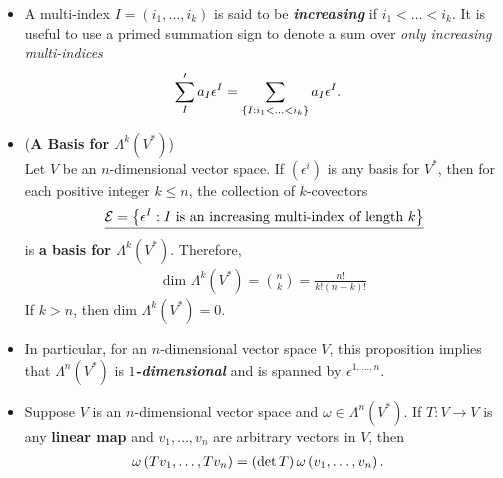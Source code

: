 \documentclass[11pt]{article}
\begin{document}
\begin{itemize}
\item \begin{definition}
A multi-index $I=(i_1,\ldots, i_k)$ is said to be \emph{\textbf{increasing}} if $i_1 < \ldots < i_k$. It is useful
to use a primed summation sign to denote a sum over \emph{only increasing multi-indices}
\begin{align*}
\sum_{I}'a_{I}\epsilon^{I} &= \sum_{\left\{I: i_1 < \ldots < i_k\right\}}a_{I}\epsilon^{I}.
\end{align*}
\end{definition}

\item \begin{proposition}\label{prop: basis_alternating_tensor} (\textbf{A Basis for $\Lambda^k(V^{*})$})\\
Let $V$ be an $n$-dimensional vector space. If $(\epsilon^i)$ is any basis for $V^{*}$, then for each positive integer $k \le n$, the collection of $k$-covectors
\begin{align*}
\underline{\mathcal{E} = \left\{\epsilon^I: \text{$I$ is an increasing multi-index of length $k$}\right\}}
\end{align*} is \textbf{a basis for $\Lambda^k(V^{*})$}. Therefore,
\begin{align*}
\text{dim }\Lambda^k(V^{*}) = {n  \choose  k} = \frac{n!}{k! (n-k)!}
\end{align*} If $k > n$, then $\text{dim }\Lambda^k(V^{*}) = 0$.
\end{proposition}

\item \begin{remark}
In particular, for an $n$-dimensional vector space $V$, this proposition implies that $\Lambda^n(V^{*})$ is \emph{\textbf{$1$-dimensional}} and is spanned by $\epsilon^{1,\ldots,n}$.
\end{remark}

\item \begin{proposition} Suppose $V$ is an $n$-dimensional vector space and $\omega \in \Lambda^n(V^{*})$. If $T: V \rightarrow V$ is any \textbf{linear map} and $v_1, \ldots, v_n$ are arbitrary vectors in $V$, then
\begin{align}
\omega\left(Tv_1, \ldots, Tv_n\right) &= \left(\det{T}\right)\omega\left(v_1, \ldots, v_n\right). \label{eqn: k_covector_linear_map}
\end{align}
\end{proposition}
\end{itemize}
\end{document}
